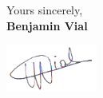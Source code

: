 \documentclass{academia}
\begin{document}
%

Yours sincerely,\\[1.5em]


\textbf{Benjamin Vial}

\includegraphics[width=3cm]{sig.png}
%
\end{document}
